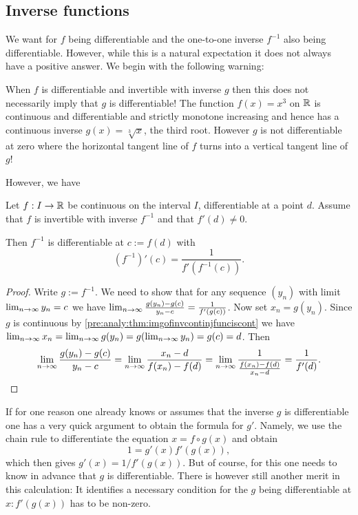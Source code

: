\documentclass[10pt, a4paper]{article}
\begin{document}
\subsection{Inverse functions}

We want for $f$ being differentiable and the one-to-one inverse $f ^ {-1}$ also being differentiable.
However,
while this is a natural expectation it does not always have a positive answer.
We begin with the following warning:

When $f$ is differentiable and invertible with inverse $g$ then this does not necessarily imply that $g$ is differentiable!
The function $f(x) = x ^ 3$ on $\mathbb{R}$ is continuous and differentiable and strictly monotone increasing and hence has a continuous inverse $g(x) = \sqrt[3]{x}$,
the third root.
However $g$ is not differentiable at zero where the horizontal tangent line of $f$ turns into a vertical tangent line of $g$!

However,
we have
\begin{proposition}\label{pre:analy:prop:contfuncderivofinverse}
    Let $f : I \rightarrow \mathbb{R}$ be continuous on the interval $I$,
    differentiable at a point $d$.
    Assume that $f$ is invertible with inverse $f ^ {-1}$ and that $f'(d) \neq 0$.

    Then $f ^ {-1}$ is differentiable at $c := f(d)$ with
    \[
    (f ^ {-1})'(c) = \frac{1}{f'(f ^ {-1}(c))}.
    \]
    \begin{proof}
        Write $g := f ^ {-1}$.
        We need to show that for any sequence $(y_n)$ with limit $\lim_{n \rightarrow \infty} y_n = c$ we have $\lim_{n \rightarrow \infty} \frac{g(y_n) - g(c)}{y_n - c} = \frac{1}{f'(g(c))}$.
        Now set $x_n = g(y_n)$.
        Since $g$ is continuous by \autoref{pre:analy:thm:imgofinvcontinjfunciscont} we have $\lim_{n \rightarrow \infty} x_n = \lim_{n \rightarrow \infty} g(y_n) = g(\lim_{n \rightarrow \infty} y_n) = g(c) = d$.
        Then
        \[
        \lim_{n \rightarrow \infty}\frac{g(y_n) - g(c)}{y_n - c} = \lim_{n \rightarrow \infty} \frac{x_n - d}{f(x_n) - f(d)} = \lim_{n \rightarrow \infty}\frac{1}{\frac{f(x_n) - f(d)}{x_n - d}} = \frac{1}{f'(d)}.
        \]
    \end{proof}
\end{proposition}

\begin{remark}
    If for one reason one already knows or assumes that the inverse $g$ is differentiable one has a very quick argument to obtain the formula for $g'$.
    Namely,
    we use the chain rule to differentiate the equation $x = f \circ g(x)$ and obtain
    \[
    1 = g'(x)f'(g(x)),
    \]
    which then gives $g'(x) = 1 / f'(g(x))$.
    But of course,
    for this one needs to know in advance that $g$ is differentiable.
    There is however still another merit in this calculation:
    It identifies a necessary condition for the $g$ being differentiable at $x: f'(g(x))$ has to be non-zero.
\end{remark}
\end{document}
